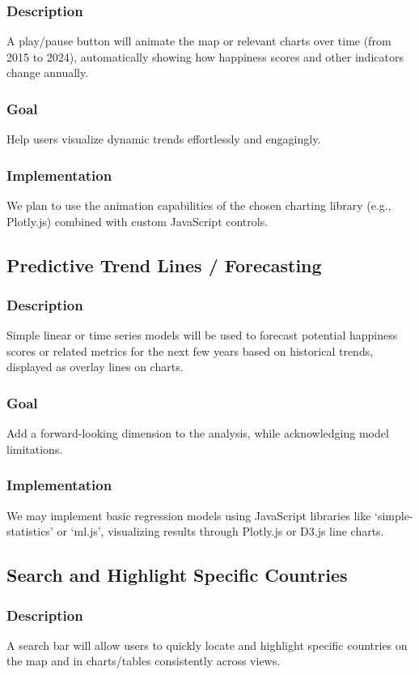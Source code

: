 \documentclass[10pt,conference,compsocconf]{IEEEtran}
\begin{document}
\subsubsection{Description}
A play/pause button will animate the map or relevant charts over time (from 2015 to 2024), automatically showing how happiness scores and other indicators change annually.
\subsubsection{Goal}
Help users visualize dynamic trends effortlessly and engagingly.
\subsubsection{Implementation}
We plan to use the animation capabilities of the chosen charting library (e.g., Plotly.js) combined with custom JavaScript controls.

\subsection{Predictive Trend Lines / Forecasting}
\subsubsection{Description}
Simple linear or time series models will be used to forecast potential happiness scores or related metrics for the next few years based on historical trends, displayed as overlay lines on charts.
\subsubsection{Goal}
Add a forward-looking dimension to the analysis, while acknowledging model limitations.
\subsubsection{Implementation}
We may implement basic regression models using JavaScript libraries like `simple-statistics' or `ml.js', visualizing results through Plotly.js or D3.js line charts.

\subsection{Search and Highlight Specific Countries}
\subsubsection{Description}
A search bar will allow users to quickly locate and highlight specific countries on the map and in charts/tables consistently across views.
\end{document}
